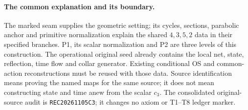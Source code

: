 \paragraph{The common explanation and its boundary.}
The marked seam supplies the geometric setting; its cycles, sections,
parabolic anchor and primitive normalization explain the shared $4,3,5,2$
data in their specified branches. P1, its scalar normalization and P2
are three levels of this construction. The operational original seed
already contains the local net, state, reflection, time flow and collar
generator. Existing conditional OS and common-action reconstructions must
be reused with those data. Source identification means proving the named
maps for the same source; it does not mean constructing state and time
anew from the scalar $c_3$. The consolidated original-source audit is
\texttt{REC20261105C3}; it changes no axiom or T1--T8 ledger marker.
